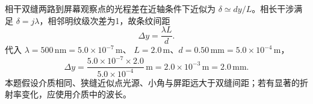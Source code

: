 相干双缝两路到屏幕观察点的光程差在近轴条件下近似为 $\delta\simeq dy/L$。相长干涉满足 $\delta=j\lambda$，相邻明纹级次差为1，故条纹间距
\[
\Delta y=\frac{\lambda L}{d}.
\]
代入 $\lambda=500\,\mathrm{nm}=5.0\times10^{-7}\,\mathrm m$、
$L=2.0\,\mathrm m$、$d=0.50\,\mathrm{mm}=5.0\times10^{-4}\,\mathrm m$，
\[
\boxed{\Delta y=\frac{5.0\times10^{-7}\times2.0}
{5.0\times10^{-4}}\,\mathrm m
=2.0\times10^{-3}\,\mathrm m=2.0\,\mathrm{mm}}.
\]
本题假设介质相同、狭缝近似点光源、小角与屏距远大于双缝间距；若有显著的折射率变化，应使用介质中的波长。
